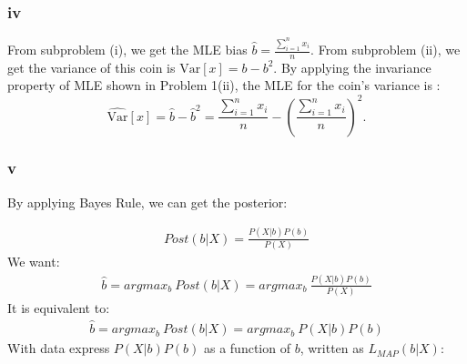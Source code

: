 \documentclass[twoside,11pt]{homework}
\begin{document}
\subsubsection*{iv}

From subproblem (i), we get the MLE bias $\hat{b} =\frac{\sum_{i=1}^n x_i}{n} $.
From subproblem (ii), we get the variance of this coin is $\mathrm{Var}[x] = b - b^2$.
By applying the invariance property of MLE shown in Problem 1(ii), the MLE for the coin's variance is :
%
\begin{equation}
\hat{\mathrm{Var}}[x] = \hat{b}- \hat{b}^2 = \frac{\sum_{i=1}^n x_i}{n} - (\frac{\sum_{i=1}^n x_i}{n})^2.
\end{equation}

\newpage
\subsubsection*{v}
By applying Bayes Rule, we can get the posterior:

\begin{equation*}
\begin{split}
Post(b|X) = \frac{P(X|b)P(b)} {P(X)}
\end{split}
\end{equation*}
\newpage
We want: 
\begin{equation*}
\begin{split}
\hat{b} = argmax_{b}~Post(b|X) = argmax_{b}~\frac{P(X|b)P(b)} {P(X)}
\end{split}
\end{equation*}
It is equivalent to:
\begin{equation*}
\begin{split}
\hat{b} = argmax_{b}~Post(b|X) = argmax_{b}~P(X|b)P(b)
\end{split}
\end{equation*}
With data express $P(X|b)P(b)$ as a function of $b$, written as $L_{MAP}(b|X)$:
\end{document}
